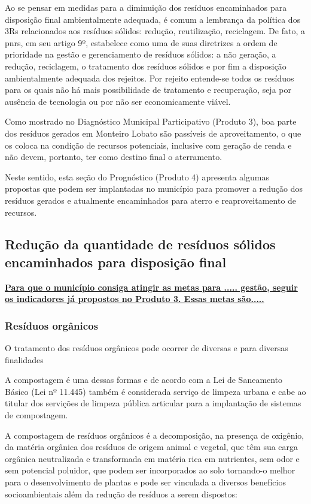 Ao se pensar em medidas para a diminuição dos resíduos encaminhados para disposição final ambientalmente adequada, é comum a lembrança da política dos 3Rs relacionados aos resíduos sólidos: redução, reutilização, reciclagem. De fato, a \gls{pnrs}, em seu artigo 9º, estabelece como uma de suas diretrizes a ordem de prioridade na gestão e gerenciamento de resíduos sólidos: a não geração, a redução, reciclagem, o tratamento dos resíduos sólidos e por fim a disposição ambientalmente adequada dos rejeitos. \cite{brasil:12305} Por rejeito entende-se todos os resíduos para os quais não há mais possibilidade de tratamento e recuperação, seja por ausência de tecnologia ou por não ser economicamente viável.

Como mostrado no Diagnóstico Municipal Participativo (Produto 3), boa parte dos resíduos gerados em Monteiro Lobato são passíveis de aproveitamento, o que os coloca na condição de recursos potenciais, inclusive com geração de renda e não devem, portanto, ter como destino final o aterramento. 

Neste sentido, esta seção do Prognóstico (Produto 4) apresenta algumas propostas que podem ser implantadas no município para promover a redução dos resíduos gerados e atualmente encaminhados para aterro e reaproveitamento de recursos.

\subsection{Redução da quantidade de resíduos sólidos encaminhados para disposição final}


\textbf{\underline{Para que o município consiga atingir as metas para ..... gestão, seguir os indicadores já propostos no Produto 3. Essas metas são.....}}



\subsubsection{Resíduos orgânicos}

O tratamento dos resíduos orgânicos pode ocorrer de diversas e para diversas finalidades

A compostagem é uma dessas formas e de acordo com a Lei de Saneamento Básico (Lei nº 11.445) também é considerada serviço de limpeza urbana e cabe ao titular dos servições de limpeza pública articular para a implantação de sistemas de compostagem.

A compostagem de resíduos orgânicos é a decomposição, na presença de oxigênio, da matéria orgânica dos resíduos de origem animal e vegetal, que têm sua carga orgânica neutralizada e transformada em matéria rica em nutrientes, sem odor e sem potencial poluidor, que podem ser incorporados ao solo tornando-o melhor para o desenvolvimento de plantas e pode ser vinculada a diversos benefícios socioambientais além da redução de resíduos a serem dispostos:

